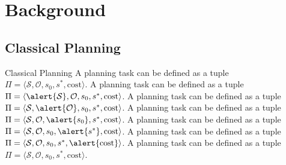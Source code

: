 \documentclass[10pt]{beamer}
\begin{document}
\section{Background}

\subsection{Classical Planning}

\begin{frame}{Classical Planning}
     {
        A planning task can be defined as a tuple~$\Pi=\langle\mathcal{S},\mathcal{O},s_0,s^*,\text{cost}\rangle$.
    }
     {
        A planning task can be defined as a tuple~$\Pi=\langle\alert{\mathcal{S}},\mathcal{O},s_0,s^*,\text{cost}\rangle$.
    }
     {
        A planning task can be defined as a tuple~$\Pi=\langle\mathcal{S},\alert{\mathcal{O}},s_0,s^*,\text{cost}\rangle$.
    }
     {
        A planning task can be defined as a tuple~$\Pi=\langle\mathcal{S},\mathcal{O},\alert{s_0},s^*,\text{cost}\rangle$.
    }
     {
        A planning task can be defined as a tuple~$\Pi=\langle\mathcal{S},\mathcal{O},s_0,\alert{s^*},\text{cost}\rangle$.
    }
     {
        A planning task can be defined as a tuple~$\Pi=\langle\mathcal{S},\mathcal{O},s_0,s^*,\alert{\text{cost}}\rangle$.
    }
     {
        A planning task can be defined as a tuple~$\Pi=\langle\mathcal{S},\mathcal{O},s_0,s^*,\text{cost}\rangle$.
    }

     { \bigskip }


\end{frame}
\end{document}
